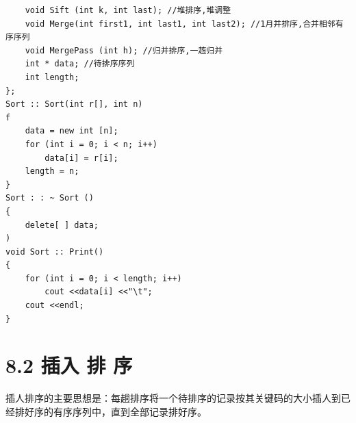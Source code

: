 \documentclass[10pt]{article}
\begin{document}
\begin{verbatim}
    void Sift (int k, int last); //堆排序,堆调整
    void Merge(int first1, int last1, int last2); //1月并排序,合并相邻有序序列
    void MergePass (int h); //归并排序,一䞥归并
    int * data; //待排序序列
    int length;
};
Sort :: Sort(int r[], int n)
f
    data = new int [n];
    for (int i = 0; i < n; i++)
        data[i] = r[i];
    length = n;
}
Sort : : ~ Sort ()
{
    delete[ ] data;
)
void Sort :: Print()
{
    for (int i = 0; i < length; i++)
        cout <<data[i] <<"\t";
    cout <<endl;
}
\end{verbatim}

\section*{8.2 插入 排 序}
插人排序的主要思想是：每趟排序将一个待排序的记录按其关键码的大小插人到已经排好序的有序序列中，直到全部记录排好序。
\end{document}
